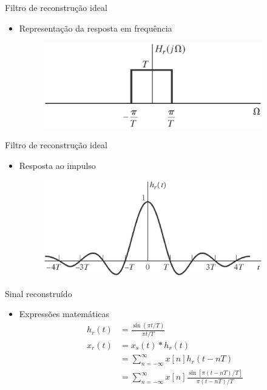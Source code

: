 \documentclass[
size=11pt,
paper=screen,
mode=present,
display=slidesnotes,
style=paintings,
nopagebreaks,
blackslide,
fleqn]{powerdot}
\begin{document}
\begin{slide}{Filtro de reconstru\c c\~ao ideal}
\begin{itemize}
   \item Representação da resposta em frequência
   \begin{figure}
      \centering
      \includegraphics[width=0.9\textwidth]{figs/filtroreconstr.eps}
   \end{figure}
\end{itemize}
\end{slide}

\begin{slide}{Filtro de reconstru\c c\~ao ideal}
\begin{itemize}
   \item Resposta ao impulso
   \begin{figure}
      \centering
      \includegraphics[width=0.9\textwidth]{figs/filtroreconstr01.eps}
   \end{figure}
\end{itemize}
\end{slide}

\begin{slide}{Sinal reconstru\'ido}
\begin{itemize}
   \item Expressões matemáticas
   \begin{align}
      h_r(t) &= \frac{\sin(\pi t/T)}{\pi t/T}\\
      x_r(t) &= x_s(t)*h_r(t)\\
             &= \sum_{n=-\infty}^{\infty}x[n]h_r(t-nT)\\
             &= \sum_{n=-\infty}^{\infty}x[n]\frac{\sin[\pi (t-nT)/T]}{\pi (t-nT)/T}
   \end{align}
\end{itemize}
\end{slide}
\end{document}
